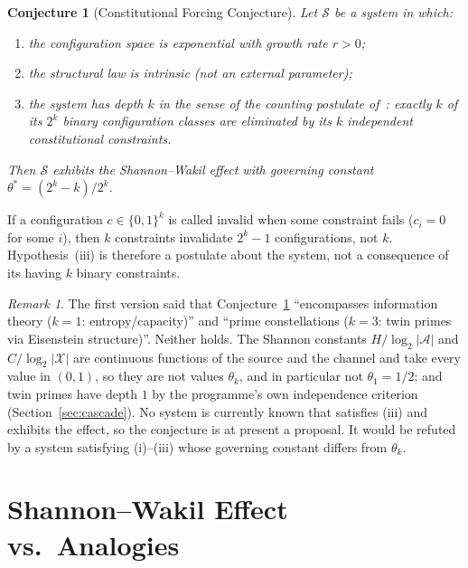 \documentclass[12pt]{amsart}
\theoremstyle{plain}
\newtheorem{conjecture}[theorem]{Conjecture}
\theoremstyle{definition}
\theoremstyle{remark}
\newtheorem{remark}[theorem]{Remark}
\begin{document}
\begin{conjecture}[Constitutional Forcing Conjecture]
\label{conj:cfc}
Let $\mathcal{S}$ be a system in which:
\begin{enumerate}[label=(\roman*)]
  \item the configuration space is exponential with growth rate $r > 0$;
  \item the structural law is intrinsic (not an external parameter);
  \item the system has depth $k$ in the sense of the counting postulate
    of~\cite{WakilCF,WakilRamanujan}: exactly $k$ of its $2^k$ binary
    configuration classes are eliminated by its $k$ independent constitutional
    constraints.
\end{enumerate}
Then $\mathcal{S}$ exhibits the Shannon--Wakil effect with governing constant
$\theta^* = (2^k - k)/2^k$.
\end{conjecture}

If a configuration $c \in \{0,1\}^k$ is called invalid when some constraint
fails ($c_i = 0$ for some $i$), then $k$ constraints invalidate $2^k - 1$
configurations, not $k$. Hypothesis~(iii) is therefore a postulate about the
system, not a consequence of its having $k$ binary constraints.

\begin{remark}
The first version said that Conjecture~\ref{conj:cfc} ``encompasses information
theory ($k=1$: entropy/capacity)'' and ``prime constellations ($k=3$: twin
primes via Eisenstein structure)''. Neither holds. The Shannon constants
$H/\log_2|\mathcal{A}|$ and $C/\log_2|\mathcal{X}|$ are continuous functions of
the source and the channel and take every value in $(0,1)$, so they are not
values $\theta_k$, and in particular not $\theta_1 = 1/2$; and twin primes have
depth $1$ by the programme's own independence criterion
(Section~\ref{sec:cascade}). No system is currently known that satisfies (iii)
and exhibits the effect, so the conjecture is at present a proposal. It would be
refuted by a system satisfying (i)--(iii) whose governing constant differs from
$\theta_k$.
\end{remark}

\section{Shannon--Wakil Effect vs.\ Analogies}
\end{document}
